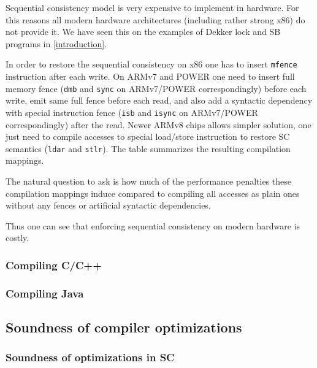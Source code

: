 \documentclass[a4paper,twoside,11pt]{article}
\numberwithin{equation}{section}
\begin{document}
Sequential consistency model is very expensive to implement in hardware. 
For this reasons all modern hardware architectures (including rather strong x86) do not provide it. 
We have seen this on the examples of Dekker lock and SB programs in \ref{introduction}.

In order to restore the sequential consistency on x86 one has to 
insert \texttt{mfence} instruction after each write.
On ARMv7 and POWER one need to insert full memory fence
(\texttt{dmb} and \texttt{sync} on ARMv7/POWER correspondingly)
before each write,
emit same full fence before each read, and also
add a syntactic dependency with special instruction fence 
(\texttt{isb} and \texttt{isync} on ARMv7/POWER correspondingly)
after the read.
Newer ARMv8 chips allows simpler solution, 
one just need to compile accesses to special 
load/store instruction to restore SC semantics
(\texttt{ldar} and \texttt{stlr}).
The table summarizes the resulting compilation mappings.


The natural question to ask is how much of the performance penalties
these compilation mappings induce compared to compiling all accesses as plain ones
without any fences or artificial syntactic dependencies.


Thus one can see that enforcing sequential consistency on modern hardware is costly.

\subsubsection{Compiling C/C++}

\subsubsection{Compiling Java}


\subsection{Soundness of compiler optimizations}

\subsubsection{Soundness of optimizations in SC}
\end{document}
